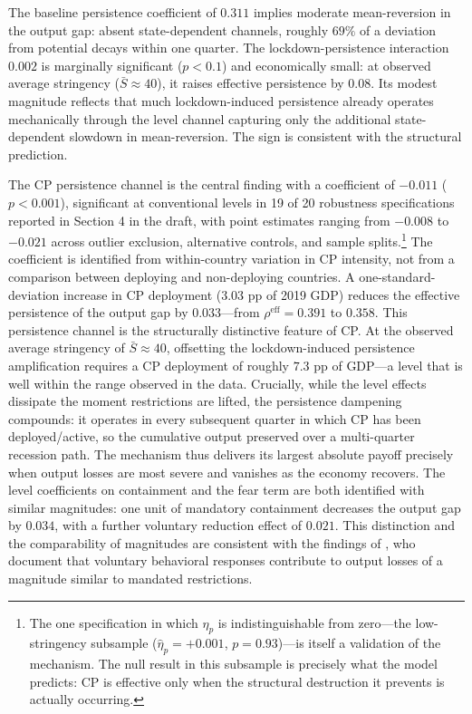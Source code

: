 \documentclass[12pt, a4paper]{article}
\begin{document}
The baseline persistence coefficient of $0.311$ implies moderate mean-reversion in the output gap: absent state-dependent channels, roughly $69\%$ of a deviation from potential decays within one quarter. The lockdown-persistence interaction $0.002$ is marginally significant ($p < 0.1$) and economically small: at observed average stringency ($\bar{S} \approx 40$), it raises effective persistence by $0.08$. Its modest magnitude reflects that much lockdown-induced persistence already operates mechanically through the level channel capturing only the additional state-dependent slowdown in mean-reversion. The sign is consistent with the structural prediction.

The CP persistence channel is the central finding with a coefficient of $-0.011$ ($p < 0.001$), significant at conventional levels in 19 of 20 robustness specifications reported in 
Section 4 in the draft, with point estimates ranging from $-0.008$ to $-0.021$ across outlier exclusion, alternative controls, and sample splits.\footnote{The one specification in which $\eta_p$ is indistinguishable from zero---the low-stringency subsample ($\hat{\eta}_p = +0.001$, $p = 0.93$)---is itself a validation of the mechanism. The null result in this subsample is precisely what the model predicts: CP is effective only when the structural destruction it prevents is actually occurring.} The coefficient is identified from within-country variation in CP intensity, not from a comparison between deploying and non-deploying countries. A one-standard-deviation increase in CP deployment ($3.03$ pp of 2019 GDP) reduces the effective persistence of the output gap by $0.033$---from $\rho^{\text{eff}} = 0.391$ to $0.358$. This persistence channel is the structurally distinctive feature of CP. At the observed average stringency of $\bar{S} \approx 40$, offsetting the lockdown-induced persistence amplification requires a CP deployment of roughly $7.3$ pp of GDP---a level that is well within the range observed in the data. Crucially, while the level effects dissipate the moment restrictions are lifted, the persistence dampening compounds: it operates in every subsequent quarter in which CP has been deployed/active, so the cumulative output preserved over a multi-quarter recession path. The mechanism thus delivers its largest absolute payoff precisely when output losses 
are most severe and vanishes as the economy recovers.
The level coefficients on containment and the fear term are both identified with similar magnitudes: one unit of mandatory containment decreases the output gap by $0.034$, with a further voluntary reduction effect of $0.021$. This distinction and the comparability of magnitudes are consistent with the findings of \citet{guerrieri2022}, who document that voluntary behavioral responses contribute to output losses of a magnitude similar to mandated restrictions. 
\end{document}
